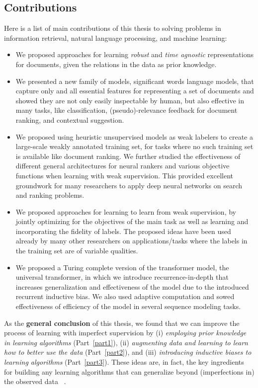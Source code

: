 \subsection{Contributions}
Here is a list of main contributions of this thesis to solving problems in information retrieval, natural language processing, and machine learning:
\begin{itemize}
    \item We proposed approaches for learning \emph{robust} and \emph{time agnostic} representations for documents, given the relations in the data as prior knowledge.
    \item We presented a new family of models, significant words language models, that capture only and all essential features for representing a set of documents and showed they are not only easily inspectable by human, but also effective in many tasks, like classification, (pseudo)-relevance feedback for document ranking, and contextual suggestion. 
    \item We proposed using heuristic unsupervised models as weak labelers to create a large-scale weakly annotated training set, for tasks where no such training set is available like document ranking. We further studied the effectiveness of different general architectures for neural rankers and various objective functions when learning with weak supervision. This provided excellent groundwork for many researchers to apply deep neural networks on search and ranking problems.
    \item We proposed approaches for learning to learn from weak supervision, by jointly optimizing for the objectives of the main task as well as learning and incorporating the fidelity of labels. The proposed ideas have been used already by many other researchers on applications/tasks where the labels in the training set are of variable qualities.  
    \item We proposed a Turing complete version of the transformer model, the universal transformer, in which we introduce recurrence-in-depth that increases generalization and effectiveness of the model due to the introduced recurrent inductive bias. We also used adaptive computation and sowed effectiveness of efficiency of the model in several sequence modeling tasks. 
\end{itemize}


\bigskip
As the \textbf{general conclusion} of this thesis, we found that we can improve the process of learning with imperfect supervision by 
(i) \emph{employing  prior knowledge in learning algorithms} (Part~\ref{part1}), 
(ii) \emph{augmenting data and learning to learn how to better use the data} (Part~\ref{part2}), and 
(iii) \emph{introducing inductive biases to learning algorithms} (Part~\ref{part3}). 
%
These ideas are, in fact, the key ingredients for building any learning algorithms that can generalize beyond (imperfections in) the observed data ~\citep{Mitchell80theneed}.

